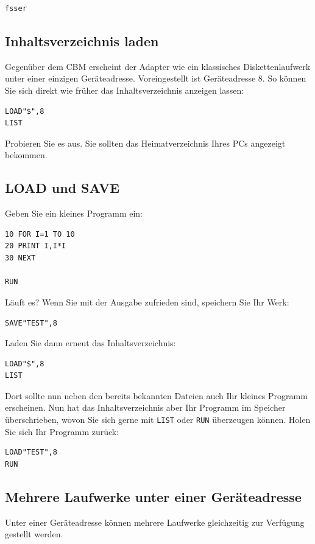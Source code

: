 \documentclass[10pt,a4paper]{scrartcl}		%
\begin{document}
\begin{verbatim}
fsser
\end{verbatim}


\subsection{Inhaltsverzeichnis laden}
Gegenüber dem CBM erscheint der Adapter wie ein klassisches Diskettenlaufwerk
unter einer einzigen Geräteadresse. Voreingestellt ist Geräteadresse 8.
So können Sie sich direkt wie früher das Inhaltsverzeichnis anzeigen
lassen:

\begin{verbatim}
LOAD"$",8
LIST
\end{verbatim}

Probieren Sie es aus. Sie sollten das Heimatverzeichnis Ihres PCs
angezeigt bekommen.

\subsection{LOAD und SAVE}
Geben Sie ein kleines Programm ein:

\lstset{language=,} %
\begin{lstlisting}
10 FOR I=1 TO 10
20 PRINT I,I*I
30 NEXT

RUN
\end{lstlisting}

Läuft es? Wenn Sie mit der Ausgabe zufrieden sind, speichern Sie Ihr Werk:

\texttt{SAVE"TEST",8}

Laden Sie dann erneut das Inhaltsverzeichnis:

\begin{verbatim}
LOAD"$",8
LIST
\end{verbatim}

Dort sollte nun neben den bereits bekannten Dateien auch Ihr
kleines Programm erscheinen. Nun hat das Inhaltsverzeichnis 
aber Ihr Programm im Speicher überschrieben, wovon Sie sich
gerne mit \texttt{LIST} oder \texttt{RUN} überzeugen können.
Holen Sie sich Ihr Programm zurück:

\begin{verbatim}
LOAD"TEST",8
RUN
\end{verbatim}


\subsection{Mehrere Laufwerke unter einer Geräteadresse}
Unter einer Geräteadresse können mehrere Laufwerke gleichzeitig zur
Verfügung gestellt werden. 
\end{document}
